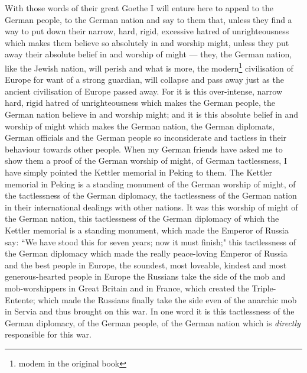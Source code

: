 With those words of their great Goethe I will enture here to appeal to the German people, to the German nation and say to them that, unless they find a way to put down their narrow, hard, rigid, excessive hatred of unrighteousness which makes them believe so absolutely in and worship might, unless they put away their absolute belief in and worship of might --- they, the German nation, like the Jewish nation, will perish and what is more, the modern\footnote{modem in the original book} civilisation of Europe for want of a strong guardian, will collapse and pass away just as the ancient civilisation of Europe passed away.
For it is this over-intense, narrow hard, rigid hatred of unrighteousness which makes the German people, the German nation believe in and worship might; and it is this absolute belief in and worship of might which makes the German nation, the German diplomats, German officials and the German people so inconsiderate and tactless in their behaviour towards other people.
When my German friends have asked me to show them a proof of the German worship of might, of German tactlessness, I have simply pointed the Kettler memorial in Peking to them.
The Kettler memorial in Peking is a standing monument of the German worship of might, of the tactlessness of the German diplomacy, the tactlessness of the German nation in their international dealings with other nations\cite{num9}.  
It was this worship of might of the German nation, this tactlessness of the German diplomacy of which the Kettler memorial is a standing monument, which made the Emperor of Russia say: ``We have stood this for seven years; now it must finish;" this tactlessness of the German diplomacy which made the really peace-loving Emperor of Russia and the best people in Europe, the soundest, most loveable, kindest and most generous-hearted people in Europe the Russians take the side of the mob and mob-worshippers in Great Britain and in France, which created the Triple-Entente; which made the Russians finally take the side even of the anarchic mob in Servia and thus brought on this war.
In one word it is this tactlessness of the German diplomacy, of the German people, of the German nation which is \emph{directly} responsible for this war.

